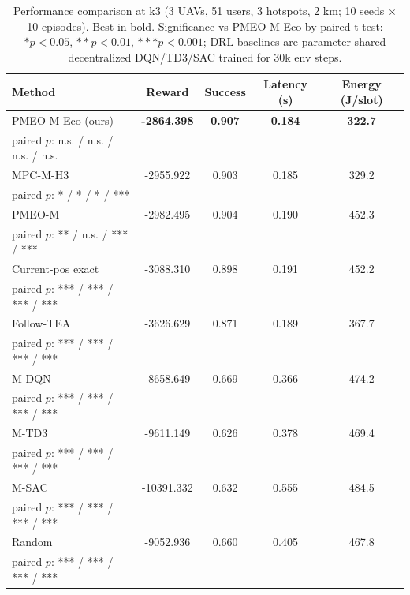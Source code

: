 \begin{table}[t]
\centering
\caption{Performance comparison at k3 (3 UAVs, 51 users, 3 hotspots, 2 km; 10 seeds $\times$ 10 episodes). Best in bold. Significance vs PMEO-M-Eco by paired t-test: $*p{<}0.05$, $**p{<}0.01$, $***p{<}0.001$; DRL baselines are parameter-shared decentralized DQN/TD3/SAC trained for 30k env steps.}
\label{tab:k3_comparison}
\small
\begin{tabular}{lcccc}
\toprule
Method & Reward & Success & Latency (s) & Energy (J/slot) \\
\midrule
PMEO-M-Eco (ours) & \textbf{-2864.398} & \textbf{0.907} & \textbf{0.184} & \textbf{322.7} \\
\footnotesize paired $p$: n.s. / n.s. / n.s. / n.s. \\
MPC-M-H3 & -2955.922 & 0.903 & 0.185 & 329.2 \\
\footnotesize paired $p$: * / * / * / *** \\
PMEO-M & -2982.495 & 0.904 & 0.190 & 452.3 \\
\footnotesize paired $p$: ** / n.s. / *** / *** \\
Current-pos exact & -3088.310 & 0.898 & 0.191 & 452.2 \\
\footnotesize paired $p$: *** / *** / *** / *** \\
Follow-TEA & -3626.629 & 0.871 & 0.189 & 367.7 \\
\footnotesize paired $p$: *** / *** / *** / *** \\
M-DQN & -8658.649 & 0.669 & 0.366 & 474.2 \\
\footnotesize paired $p$: *** / *** / *** / *** \\
M-TD3 & -9611.149 & 0.626 & 0.378 & 469.4 \\
\footnotesize paired $p$: *** / *** / *** / *** \\
M-SAC & -10391.332 & 0.632 & 0.555 & 484.5 \\
\footnotesize paired $p$: *** / *** / *** / *** \\
Random & -9052.936 & 0.660 & 0.405 & 467.8 \\
\footnotesize paired $p$: *** / *** / *** / *** \\
\bottomrule
\end{tabular}
\end{table}
